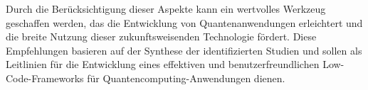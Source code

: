 Durch die Berücksichtigung dieser Aspekte kann ein wertvolles Werkzeug geschaffen werden, das die Entwicklung von Quantenanwendungen 
erleichtert und die breite Nutzung dieser zukunftsweisenden Technologie fördert. Diese Empfehlungen basieren auf der Synthese der 
identifizierten Studien und sollen als Leitlinien für die Entwicklung eines effektiven und benutzerfreundlichen Low-Code-Frameworks 
für Quantencomputing-Anwendungen dienen. 


